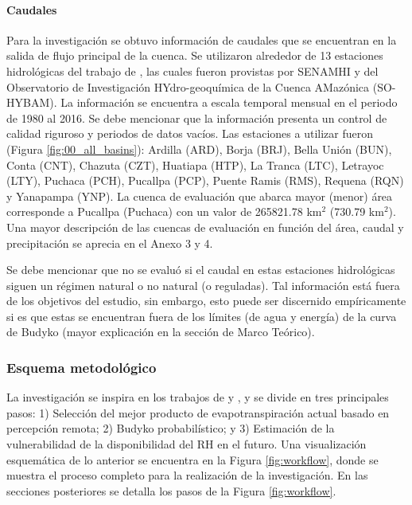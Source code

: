 \documentclass[12pt]{article}
\begin{document}
\paragraph{Caudales}\mbox{}

Para la investigación se obtuvo información de caudales que se encuentran en la salida de flujo principal de la cuenca. Se utilizaron alrededor de 13 estaciones hidrológicas del trabajo de \citet{Aybar2019}, las cuales fueron provistas por SENAMHI y del Observatorio de Investigación HYdro-geoquímica de la Cuenca AMazónica (SO-HYBAM). La información se encuentra a escala temporal mensual en el periodo de 1980 al 2016. Se debe mencionar que la información presenta un control de calidad riguroso y periodos de datos vacíos. Las estaciones a utilizar fueron (Figura \ref{fig:00_all_basins}): Ardilla (ARD), Borja (BRJ), Bella Unión (BUN), Conta (CNT), Chazuta (CZT), Huatiapa (HTP), La Tranca (LTC), Letrayoc (LTY), Puchaca (PCH), Pucallpa (PCP), Puente Ramis (RMS), Requena (RQN) y Yanapampa (YNP). La cuenca de evaluación que abarca mayor (menor) área corresponde a Pucallpa (Puchaca) con un valor de 265821.78 km$^{2}$ (730.79 km$^{2}$). Una mayor descripción de las cuencas de evaluación en función del área, caudal y precipitación se aprecia en el Anexo 3 y 4.

Se debe mencionar que no se evaluó si el caudal en estas estaciones hidrológicas siguen un régimen natural o no natural (o reguladas). Tal información está fuera de los objetivos del estudio, sin embargo, esto puede ser discernido empíricamente si es que estas se encuentran fuera de los límites (de agua y energía) de la curva de Budyko (mayor explicación en la sección de Marco Teórico).

\clearpage

\thispagestyle{empty}
\clearpage

\thispagestyle{empty}
\clearpage

\subsubsection{Esquema metodológico}

La investigación se inspira en los trabajos de \citet{Weerasinghe2019discuss} y \citet{Singh2015}, y se divide en tres principales pasos: 1) Selección del mejor producto de evapotranspiración actual basado en percepción remota; 2) Budyko probabilístico; y 3) Estimación de la vulnerabilidad de la disponibilidad del RH en el futuro. Una visualización esquemática de lo anterior se encuentra en la Figura \ref{fig:workflow}, donde se muestra el proceso completo para la realización de la investigación. En las secciones posteriores se detalla los pasos de la Figura \ref{fig:workflow}.
\end{document}

